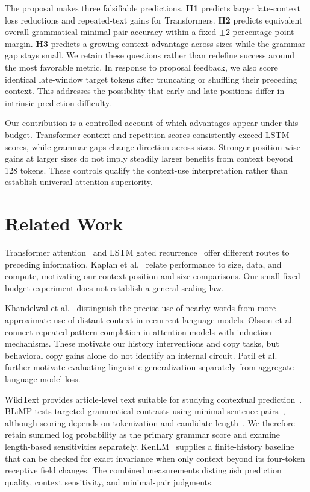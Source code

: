 \documentclass[10pt]{article}
\begin{document}
The proposal makes three falsifiable predictions. \textbf{H1} predicts larger late-context loss reductions and repeated-text gains for Transformers. \textbf{H2} predicts equivalent overall grammatical minimal-pair accuracy within a fixed $\pm2$ percentage-point margin. \textbf{H3} predicts a growing context advantage across sizes while the grammar gap stays small. We retain these questions rather than redefine success around the most favorable metric. In response to proposal feedback, we also score identical late-window target tokens after truncating or shuffling their preceding context. This addresses the possibility that early and late positions differ in intrinsic prediction difficulty.

Our contribution is a controlled account of which advantages appear under this budget. Transformer context and repetition scores consistently exceed LSTM scores, while grammar gaps change direction across sizes. Stronger position-wise gains at larger sizes do not imply steadily larger benefits from context beyond 128 tokens. These controls qualify the context-use interpretation rather than establish universal attention superiority.

\section{Related Work}

Transformer attention~\cite{vaswani2017attention} and LSTM gated recurrence~\cite{hochreiter1997lstm} offer different routes to preceding information. Kaplan et al.~\cite{kaplan2020scaling} relate performance to size, data, and compute, motivating our context-position and size comparisons. Our small fixed-budget experiment does not establish a general scaling law.

Khandelwal et al.~\cite{khandelwal2018context} distinguish the precise use of nearby words from more approximate use of distant context in recurrent language models. Olsson et al.~\cite{olsson2022induction} connect repeated-pattern completion in attention models with induction mechanisms. These motivate our history interventions and copy tasks, but behavioral copy gains alone do not identify an internal circuit. Patil et al.~\cite{patil2024fict} further motivate evaluating linguistic generalization separately from aggregate language-model loss.

WikiText provides article-level text suitable for studying contextual prediction~\cite{merity2017pointer}. BLiMP tests targeted grammatical contrasts using minimal sentence pairs~\cite{warstadt2020blimp}, although scoring depends on tokenization and candidate length~\cite{ueda2024length}. We therefore retain summed log probability as the primary grammar score and examine length-based sensitivities separately. KenLM~\cite{heafield2011kenlm} supplies a finite-history baseline that can be checked for exact invariance when only context beyond its four-token receptive field changes. The combined measurements distinguish prediction quality, context sensitivity, and minimal-pair judgments.
\end{document}

